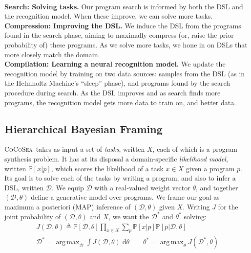 \documentclass{article}
\newcommand{\system}{\textsc{CoCoSea}~}
\DeclareMathOperator*{\argmax}{arg\,max} %
\newcommand{\probability}{\mathds{P}} %
\begin{document}
\\\noindent \textbf{Search: Solving tasks.}  Our program search
is informed by both the DSL and the recognition model. When these
improve, we can solve more tasks.
\\\noindent\textbf{Compression: Improving the DSL.} We induce the DSL
from the programs found in the search phase, aiming
to maximally compress (or, raise the prior probability of) these
programs.  As we solve more tasks, we hone in on DSLs that
more closely match the domain.
\\\noindent \textbf{Compilation: Learning a neural recognition model.}  We
update the recognition model by training on two data sources: samples
from the DSL (as in the Helmholtz Machine's ``sleep'' phase), and
programs found by the search procedure during search. As the DSL
improves and as search finds more programs, the recognition model gets
more data to train on, and better data.

\subsection{Hierarchical Bayesian Framing}\label{mathematicalFraming}

\system takes as input a set of \emph{tasks}, written $X$, each of which is a program synthesis problem.
It has at its disposal a domain-specific \emph{likelihood model}, written $\probability[x|p]$, which scores the likelihood of a task $x\in X$ given a program $p$.%
Its goal is to solve each of the tasks by writing a program,
and also to infer a DSL, written $\mathcal{D}$.
We equip $\mathcal{D}$ with a real-valued weight vector $\theta$, and together
$(\mathcal{D},\theta)$ define a generative model over programs.
We frame our goal as maximum a posteriori (MAP) inference of $(\mathcal{D},\theta)$ given $X$.
Writing $J$ for the joint probability of $(\mathcal{D},\theta)$ and $X$, we want the $\mathcal{D}^*$ and $\theta^*$ solving:
\begin{align}\label{intractableObjectives}
\nonumber  J(\mathcal{D},\theta)\triangleq \probability[\mathcal{D},\theta]\prod_{x\in X} \sum_p \probability[x|p]\probability[p|\mathcal{D},\theta]\\
  \mathcal{D}^* = \argmax_{\mathcal{D}}\int J(\mathcal{D},\theta)\;\mathrm{d}\theta \qquad
  \theta^* =\argmax_\theta J(\mathcal{D}^*,\theta)
\end{align}
\end{document}
